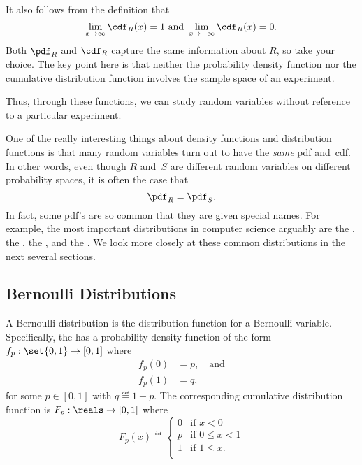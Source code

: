 \iffalse
\begin{align*}
\cdf_R(x) & = \pr{R \leq x} \\
          & = \sum_{y \leq x} \pr{R = y} \\
          & = \sum_{y \leq x} \pdf_R(y).
\end{align*}
\fi

It also follows from the definition that
\[\lim_{x \to \infty}\cdf_R(x) = 1 \text{  and  } \lim_{x \to -\infty}
\cdf_R(x) = 0.
\]
Both $\pdf_R$ and $\cdf_R$ capture the same information about $R$, so
take your choice.  The key point here is that neither the probability
density function nor the cumulative distribution function involves the
sample space of an experiment.

\begin{editingnotes}
Thus, through these functions, we can study random variables without
reference to a particular experiment.
\end{editingnotes}

One of the really interesting things about density functions and
distribution functions is that many random variables turn out to have
the \emph{same} pdf and~cdf.  In other words, even though $R$ and~$S$
are different random variables on different probability spaces, it is
often the case that
\begin{equation*}
    \pdf_R = \pdf_S.
\end{equation*}
In fact, some pdf's are so common that they are given special names.
For example, the most important distributions in computer science
arguably are the , the , the , and the
.  We look more closely at these common
distributions in the next several sections.

\subsection{Bernoulli Distributions}\label{sec:bernoulli_dist}

A Bernoulli distribution is the distribution function for a Bernoulli
variable.  Specifically, the  has a
probability density function of the form $f_p: \set{0, 1} \to [0, 1]$
where
\begin{align*}
    f_p(0) &= p, \quad\text{and} \\
    f_p(1) &= q,
\end{align*}
for some $p \in [0, 1]$ with $q \eqdef 1-p$.  The corresponding
cumulative distribution function is $F_p: \reals \to [0, 1]$ where
\begin{equation*}
F_{p}(x) \eqdef
    \begin{cases}
        0 & \text{if $x < 0$} \\
        p & \text{if $0 \le x < 1$} \\
        1 & \text{if $1 \le x$}. \\
    \end{cases}
\end{equation*}


